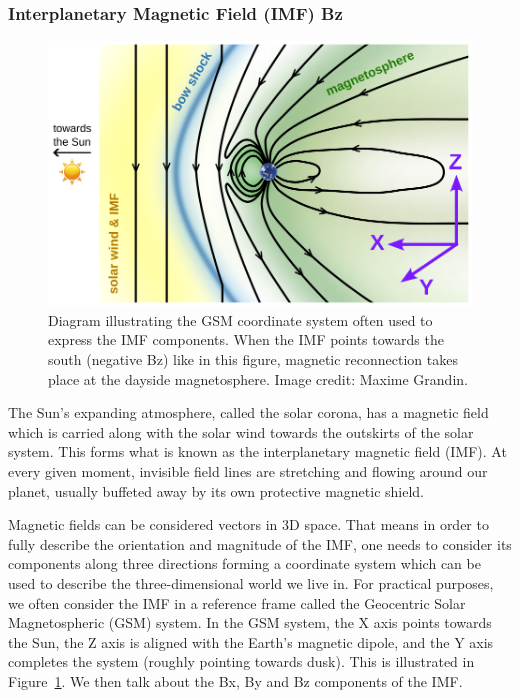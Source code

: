 \documentclass{article}
\begin{document}
\subsubsection{Interplanetary Magnetic Field (IMF) Bz}

\begin{figure}
  \includegraphics[width=\linewidth]{Fig6_GSE_IMF.png}
  \caption{Diagram illustrating the GSM coordinate system often used to express the IMF components. When the IMF points towards the south (negative Bz) like in this figure, magnetic reconnection takes place at the dayside magnetosphere. Image credit: Maxime Grandin.}
  \label{fig-bz}
\end{figure}

The Sun's expanding atmosphere, called the solar corona, has a magnetic field which is carried along with the solar wind towards the outskirts of the solar system. This forms what is known as the interplanetary magnetic field (IMF). At every given moment, invisible field lines are stretching and flowing around our planet, usually buffeted away by its own protective magnetic shield.

Magnetic fields can be considered vectors in 3D space. That means in order to fully describe the orientation and magnitude of the IMF, one needs to consider its components along three directions forming a coordinate system which can be used to describe the three-dimensional world we live in. For practical purposes, we often consider the IMF in a reference frame called the Geocentric Solar Magnetospheric (GSM) system. In the GSM system, the X axis points towards the Sun, the Z axis is aligned with the Earth's magnetic dipole, and the Y axis completes the system (roughly pointing towards dusk). This is illustrated in Figure~\ref{fig-bz}. We then talk about the Bx, By and Bz components of the IMF.
\end{document}
